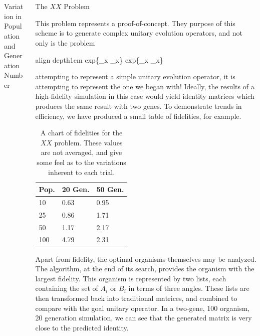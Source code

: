 \documentclass[12pt]{beamer}
\renewcommand{\maketitle}{%
	\begin{center}%
		\Huge\inserttitle\\[5mm]%
		\Large\insertauthor\\[5mm]%
		\Large\insertinstitute%
	\end{center}%
	\vspace*{-1.5ex}%
}
\newcommand*\mystrut[1]{\vrule width0pt height0pt depth#1\relax}
\begin{document}
\begin{frame}{\maketitle}
\begin{columns}
\begin{column}{.45\textwidth}
\begin{exampleblock}{Variation in Population and Generation Number}
\begin{figure}[t!]
\end{figure}
		\end{exampleblock}


		\end{column}
		
							\begin{column}{.45\textwidth}		

	\begin{block}{The $XX$ Problem} \label{xx}

	This problem represents a proof-of-concept. They purpose of this scheme is to generate complex unitary evolution operators, and not only is the problem

	\begin{empheq}[box=\fbox]{align}
		\mystrut{1em} exp\{\sigma_x \otimes \sigma_x\} \mapsto exp\{\sigma_x \otimes \sigma_x\}
	\end{empheq}

	attempting to represent a simple unitary evolution operator, it is attempting to represent the one we began with! Ideally, the results of a high-fidelity simulation in this case would yield identity matrices which produces the same result with two genes. To demonstrate trends in efficiency, we have produced a small table of fidelities, for example. 

	\begin{table}[htpb]
		\centering
			\begin{tabular}{||l | l l ||} 
			\hline
				Pop. & 20 Gen. & 50 Gen. \\ [0.5ex] 
			\hline
				10  & 0.63   & 0.95      \\ 
				25  & 0.86   & 1.71      \\
				50  & 1.17   & 2.17      \\
				100 & 4.79   & 2.31      \\
			\hline
			\end{tabular}
		\centering
		\caption{A chart of fidelities for the $XX$ problem. These values are not averaged, and give some feel as to the variations inherent to each trial.}
	\end{table}

	Apart from fidelity, the optimal organisms themselves may be analyzed. The algorithm, at the end of its search, provides the organism with the largest fidelity. This organism is represented by two lists, each containing the set of $A_i$ or $B_i$ in terms of three angles. These lists are then transformed back into traditional matrices, and combined to compare with the goal unitary operator. In a two-gene, 100 organism, 20 generation simulation, we can see that the generated matrix is very close to the predicted identity. 


\end{block}
\end{column}
\end{columns}
\end{frame}
\end{document}
